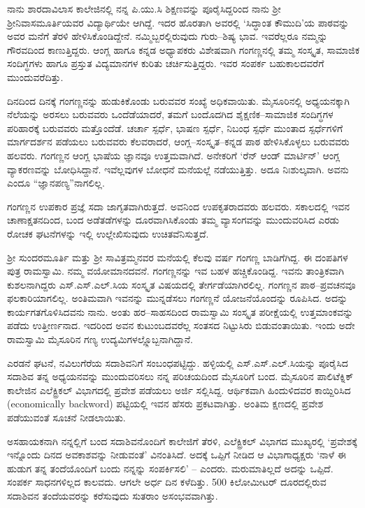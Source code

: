 ನಾನು ಶಾರದಾವಿಲಾಸ ಕಾಲೇಜಿನಲ್ಲಿ ನನ್ನ ಪಿ.ಯು.ಸಿ ಶಿಕ್ಷಣವನ್ನು ಪೂರೈಸಿದ್ದರಿಂದ ನಾನು ಶ್ರೀ ಶ್ರೀನಿವಾಸಮೂರ್ತಿಯವರ ವಿದ್ಯಾರ್ಥಿಯೇ ಆಗಿದ್ದೆ. ಇದರ ಹೊರತಾಗಿ ಅವರಲ್ಲಿ ‘ಸಿದ್ಧಾಂತ ಕೌಮುದಿ’ಯ ಪಾಠವನ್ನು ಅವರ ಮನೆಗೆ ತೆರಳಿ ಹೇಳಿಸಿಕೊಂಡಿದ್ದೇನೆ. ನಮ್ಮಿಬ್ಬರಲ್ಲಿರುವುದು ಗುರು–ಶಿಷ್ಯ ಭಾವ. ಇವರೆಲ್ಲರೂ ನಮ್ಮನ್ನು ಗೌರವದಿಂದ ಕಾಣುತ್ತಿದ್ದರು. ಆಂಗ್ಲ ಹಾಗೂ ಕನ್ನಡ ಅಧ್ಯಾಪಕರು ವಿಶೇಷವಾಗಿ ಗಂಗಣ್ಣನಲ್ಲಿ ತಮ್ಮ ಸಂಸ್ಕೃತ, ಸಾಮಾಜಿಕ ಸಂದಿಗ್ಧಗಳು ಹಾಗೂ ಪ್ರಸ್ತುತ ವಿದ್ಯಮಾನಗಳ ಕುರಿತು ಚರ್ಚಿಸುತ್ತಿದ್ದರು. ಇವರ ಸಂಪರ್ಕ ಬಹುಕಾಲದವರೆಗೆ ಮುಂದುವರೆದಿತ್ತು.

ದಿನದಿಂದ ದಿನಕ್ಕೆ ಗಂಗಣ್ಣನನ್ನು ಹುಡುಕಿಕೊಂಡು ಬರುವವರ ಸಂಖ್ಯೆ ಅಧಿಕವಾಯಿತು. ಮೈಸೂರಿನಲ್ಲಿ ಅಧ್ಯಯನಕ್ಕಾಗಿ ನೆಲೆಯನ್ನು ಅರಸಲು ಬರುವವರು ಒಂದೆಡೆಯಾದರೆ, ತಮಗೆ ಬಂದೊದಗಿದ ಶೈಕ್ಷಣಿಕ–ಸಾಮಾಜಿಕ ಸಂದಿಗ್ಧಗಳ ಪರಿಹಾರಕ್ಕೆ ಬರುವವರು ಮತ್ತೊಂದೆಡೆ. ಚರ್ಚಾ ಸ್ಪರ್ಧೆ, ಭಾಷಣ ಸ್ಪರ್ಧೆ, ನಿಬಂಧ ಸ್ಪರ್ಧೆ ಮುಂತಾದ ಸ್ಪರ್ಧೆಗಳಿಗೆ ಮಾರ್ಗದರ್ಶನ ಪಡೆಯಲು ಬರುವವರು ಕೆಲವರಾದರೆ, ಆಂಗ್ಲ–ಸಂಸ್ಕೃತ–ಕನ್ನಡ ಪಾಠ ಹೇಳಿಸಿಕೊಳ್ಳಲು ಬರುವವರು ಹಲವರು. ಗಂಗಣ್ಣನ ಆಂಗ್ಲ ಭಾಷೆಯ ಜ್ಞಾನವೂ ಉತ್ತಮವಾಗಿದೆ. ಅನೇಕರಿಗೆ ‘ರೆನ್ ಆಂಡ್ ಮಾರ್ಟಿನ್’ ಆಂಗ್ಲ ವ್ಯಾಕರಣವನ್ನು ಬೋಧಿಸಿದ್ದಾನೆ. ಇವೆಲ್ಲವುಗಳ ಬೋಧನೆ ಮನೆಯಲ್ಲೆ ನಡೆಯುತ್ತಿತ್ತು. ಅದೂ ನಿಃಶುಲ್ಕವಾಗಿ. ಅವನು ಎಂದೂ “ಜ್ಞಾನಪಣ್ಯ”ನಾಗಲಿಲ್ಲ.

ಗಂಗಣ್ಣನ ಉಪಕಾರ ಪ್ರಜ್ಞೆ ಸದಾ ಜಾಗೃತವಾಗಿರುತ್ತದೆ. ಅವನಿಂದ ಉಪಕೃತರಾದವರು ಹಲವರು. ಸಕಾಲದಲ್ಲಿ ಇವನ ಚಾಣಾಕ್ಷತನದಿಂದ, ಬಂದ ಅಡೆತಡೆಗಳನ್ನು ದೂರವಾಗಿಸಿಕೊಂಡು ತಮ್ಮ ವ್ಯಾಸಂಗವನ್ನು ಮುಂದುವರಿಸಿದ ಎರಡು ರೋಚಕ ಘಟನೆಗಳನ್ನು ಇಲ್ಲಿ ಉಲ್ಲೇಖಿಸುವುದು ಉಚಿತವೆನಿಸುತ್ತದೆ.

ಶ್ರೀ ಸುಂದರಮೂರ್ತಿ ಮತ್ತು ಶ್ರೀ ಸಾವಿತ್ರಮ್ಮನವರ ಮನೆಯಲ್ಲಿ ಕೆಲವು ವರ್ಷ ಗಂಗಣ್ಣ ಬಾಡಿಗೆಗಿದ್ದ. ಈ ದಂಪತಿಗಳ ಪುತ್ರ ರಾಮಸ್ವಾಮಿ. ನಮ್ಮ ವಯೋಮಾನದವನೆ. ಗಂಗಣ್ಣನನ್ನು ಇವ ಬಹಳ ಹಚ್ಚಿಕೊಂಡಿದ್ದ. ಇವನು ತಾಂತ್ರಿಕವಾಗಿ ಕುಶಲನಾಗಿದ್ದರು ಎಸ್.ಎಸ್.ಎಲ್.ಸಿಯ ಸಂಸ್ಕೃತ ವಿಷಯದಲ್ಲಿ ತೇರ್ಗಡೆಯಾಗಿರಲಿಲ್ಲ. ಗಂಗಣ್ಣನ ಪಾಠ–ಪ್ರವಚನವೂ ಫಲಕಾರಿಯಾಗಲಿಲ್ಲ. ಅಂತಿಮವಾಗಿ ಇವನನ್ನು ಮುನ್ನಡೆಸಲು ಗಂಗಣ್ಣನೆ ಯೋಜನೆಯೊಂದನ್ನು ರೂಪಿಸಿದ. ಅದನ್ನು ಕಾರ್ಯಗತಗೊಳಿಸಿದವನು ನಾನು. ಅಂತು ಹರ–ಸಾಹಸದಿಂದ ರಾಮಸ್ವಾಮಿ ಸಂಸ್ಕೃತ ಪರೀಕ್ಷೆಯಲ್ಲಿ ಉತ್ತಮಾಂಕವನ್ನು ಪಡೆದು ಉತ್ತೀರ್ಣನಾದ. ಇದರಿಂದ ಅವನ ಕುಟುಂಬದವರೆಲ್ಲ ಸಂತಸದ ನಿಟ್ಟುಸಿರು ಬಿಡುವಂತಾಯಿತು. ಇಂದು ಅದೇ ರಾಮಸ್ವಾಮಿ ಮೈಸೂರಿನ ಗಣ್ಯ ಉದ್ಯಮಿಗಳಲ್ಲ್ಲೊಬ್ಬನಾಗಿದ್ದಾನೆ.

ಎರಡನೆ ಘಟನೆ, ನವಿಲುಗೆರೆಯ ಸದಾಶಿವನಿಗೆ ಸಂಬಂಧಪಟ್ಟಿದ್ದು. ಹಳ್ಳಿಯಲ್ಲಿ ಎಸ್.ಎಸ್.ಎಲ್.ಸಿಯನ್ನು ಪೂರೈಸಿದ ಸದಾಶಿವ ತನ್ನ ಅಧ್ಯಯನವನ್ನು ಮುಂದುವರಿಸಲು ನನ್ನ ಪರಿಚಯದಿಂದ ಮೈಸೂರಿಗೆ ಬಂದ. ಮೈಸೂರಿನ ಪಾಲಿಟೆಕ್ನಿಕ್ ಕಾಲೇಜಿನ ಎಲೆಕ್ಟ್ರಿಕಲ್ ವಿಭಾಗದಲ್ಲಿ ಪ್ರವೇಶ ಪಡೆಯಲು ಅರ್ಜಿ ಸಲ್ಲಿಸಿದ್ದ. ಆರ್ಥಿಕವಾಗಿ ಹಿಂದುಳಿದವರ ಕಾಯ್ದಿರಿಸಿದ (economically backword) ಪಟ್ಟಿಯಲ್ಲಿ ಇವನ ಹೆಸರು ಪ್ರಕಟವಾಗಿತ್ತು. ಅಂತಿಮ ಕ್ಷಣದಲ್ಲಿ ಪ್ರವೇಶ ಪಡೆಯುವಂತೆ ಸೂಚನೆ ನೀಡಲಾಯಿತು.

ಅಸಹಾಯಕನಾಗಿ ನನ್ನಲ್ಲಿಗೆ ಬಂದ ಸದಾಶಿವನೊಂದಿಗೆ ಕಾಲೇಜಿಗೆ ತೆರಳಿ, ಎಲೆಕ್ಟ್ರಿಕಲ್ ವಿಭಾಗದ ಮುಖ್ಯರಲ್ಲಿ ‘ಪ್ರವೇಶಕ್ಕೆ ಇನ್ನೊಂದು ದಿನದ ಅವಕಾಶವನ್ನು ನೀಡುವಂತೆ’ ವಿನಂತಿಸಿದೆ. ಅದಕ್ಕೆ ಒಪ್ಪಿಗೆ ನೀಡಿದ ಆ ವಿಭಾಗಾಧ್ಯಕ್ಷರು ‘ನಾಳೆ ಈ ಹುಡುಗ ತನ್ನ ತಂದೆಯೊಂದಿಗೆ ಬಂದು ನನ್ನನ್ನು ಸಂಪರ್ಕಿಸಲಿ’ – ಎಂದರು. ಮರುಮಾತಿಲ್ಲದೆ ಅದನ್ನು ಒಪ್ಪಿದೆ. ಸಂಪರ್ಕ ಸಾಧನಗಳಿಲ್ಲದ ಕಾಲವದು. ಆಗಲೇ ಅರ್ಧ ದಿನ ಕಳೆದಿತ್ತು. 500 ಕಿಲೋಮೀಟರ್ ದೂರದಲ್ಲಿರುವ ಸದಾಶಿವನ ತಂದೆಯವರನ್ನು ಕರೆಸುವುದು ಸುತರಾಂ ಅಸಂಭವವಾಗಿತ್ತು. 

